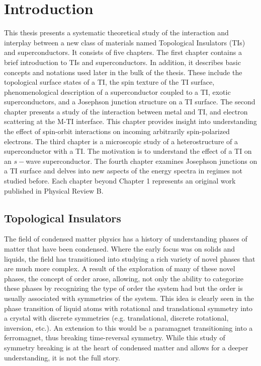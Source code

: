 
\chapter{Introduction}

This thesis presents a systematic theoretical study of the interaction and interplay between a new class of materials named Topological Insulators (TIs) and superconductors. It consists of five chapters. The first chapter contains a brief introduction to TIs and superconductors. In addition, it describes basic concepts and notations used later in the bulk of the thesis. These include the topological surface states of a TI, the spin texture of the TI surface, phenomenological description of a superconductor coupled to a TI, exotic superconductors, and a Josephson junction structure on a TI surface. The second chapter presents a study of the interaction between metal and TI, and electron scattering at the M-TI interface. This chapter provides insight into understanding the effect of spin-orbit interactions on incoming arbitrarily spin-polarized electrons. The third chapter is a microscopic study of a heterostructure of a superconductor with a TI. The motivation is to understand the effect of a TI on an $s-$wave superconductor. The fourth chapter examines Josephson junctions on a TI surface and delves into new aspects of the energy spectra in regimes not studied before. 
%
Each chapter beyond Chapter 1 represents an original work published in Physical Review B. 

\section{Topological Insulators}
The field of condensed matter physics has a history of understanding phases of matter that have been condensed. Where the early focus was on solids and liquids, the field has transitioned into studying a rich variety of novel phases that are much more complex. A result of the exploration of many of these novel phases, the concept of order arose, allowing, not only the ability to categorize these phases by recognizing the type of order the system had but the order is usually associated with symmetries of the system. This idea is clearly seen in the phase transition of liquid atoms with rotational and translational symmetry into a crystal with discrete symmetries (e.g. translational, discrete rotational, inversion, etc.). An extension to this would be a paramagnet transitioning into a ferromagnet, thus breaking time-reversal symmetry. While this study of symmetry breaking is at the heart of condensed matter and allows for a deeper understanding, it is not the full story. 

